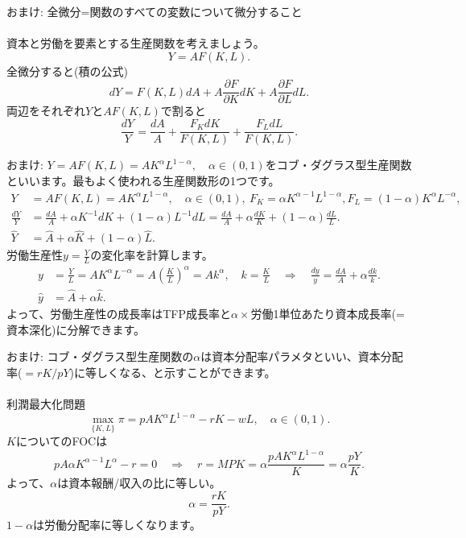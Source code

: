 \begin{frame}[t]{}
おまけ: 全微分=関数のすべての変数について微分すること\\~\\
資本と労働を要素とする生産関数を考えましょう。
\[
Y=AF(K, L).
\]
全微分すると(積の公式)
\[
dY=F(K, L)dA+A\frac{\partial F}{\partial K}dK+A\frac{\partial F}{\partial L}dL.
\]
両辺をそれぞれ$Y$と$AF(K, L)$で割ると
\[
\frac{dY}{Y}=\frac{dA}{A}+\frac{F_{K}dK}{F(K, L)}+\frac{F_{L}dL}{F(K, L)}.
\]
\end{frame}

\begin{frame}[t]{}
おまけ: $Y=AF(K, L)=AK^{\alpha}L^{1-\alpha}, \quad \alpha\in(0, 1)$をコブ・ダグラス型生産関数といいます。最もよく使われる生産関数形の1つです。
\[
\begin{aligned}
Y
&=
AF(K, L)=AK^{\alpha}L^{1-\alpha}, \quad \alpha\in(0, 1), \ F_{K}=\alpha K^{\alpha-1}L^{1-\alpha}, F_{L}=(1-\alpha)K^{\alpha}L^{-\alpha},\\
\frac{dY}{Y}
&=
\frac{dA}{A}+\alpha K^{-1}dK+(1-\alpha)L^{-1}dL=
\frac{dA}{A}+\alpha\frac{dK}{K}+(1-\alpha)\frac{dL}{L}.\\
\hat{Y}
&=
\hat{A}+\alpha\hat{K}+(1-\alpha)\hat{L}.
\end{aligned}
\]
労働生産性$y=\frac{Y}{L}$の変化率を計算します。
\[
\begin{aligned}
y
&=
\frac{Y}{L}
=
AK^{\alpha}L^{-\alpha}=A\left(\frac{K}{L}\right)^{\alpha}=Ak^{\alpha}, \quad k=\frac{K}{L}\quad\Rightarrow\quad
\frac{dy}{y}
=
\frac{dA}{A}+\alpha\frac{dk}{k}.\\
\hat{y}
&=
\hat{A}+\alpha\hat{k}.
\end{aligned}
\]
よって、労働生産性の成長率はTFP成長率と$\alpha\times$労働1単位あたり資本成長率(=資本深化)に分解できます。
\end{frame}

\begin{frame}[t]{}
おまけ: コブ・ダグラス型生産関数の$\alpha$は資本分配率パラメタといい、資本分配率($=rK/pY$)に等しくなる、と示すことができます。\\~\\
利潤最大化問題
\[
\max_{\{K, L\}}\pi=pAK^{\alpha}L^{1-\alpha}-rK-wL, \quad \alpha\in(0, 1).
\]
$K$についてのFOCは
\[
pA\alpha K^{\alpha-1}L^{\alpha}-r=0 \quad \Rightarrow \quad r=MPK=\alpha \frac{pAK^{\alpha}L^{1-\alpha}}{K}=\alpha \frac{pY}{K}.
\]
よって、$\alpha$は資本報酬/収入の比に等しい。
\[
\alpha=\frac{rK}{pY}.
\]
$1-\alpha$は労働分配率に等しくなります。
\end{frame}

